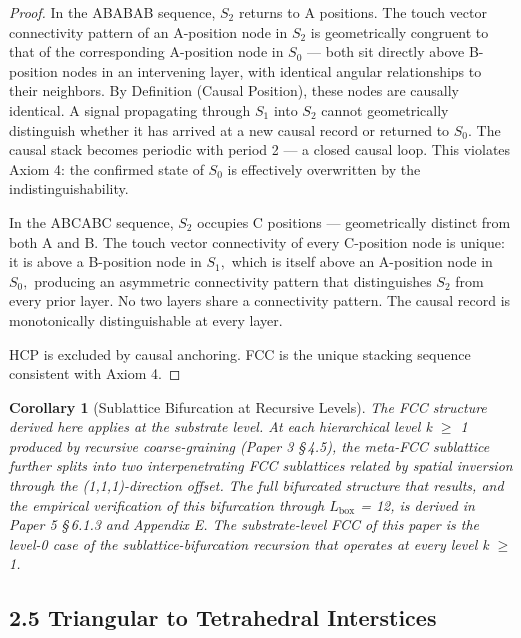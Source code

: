 \documentclass[11pt,oneside]{report}
\newtheorem{corollary}[theorem]{Corollary}
\theoremstyle{definition}
\theoremstyle{remark}
\begin{document}
\begin{proof}
In the ABABAB sequence, \ensuremath{S_{2}} returns to A positions. The touch
vector connectivity pattern of an A-position node in \ensuremath{S_{2}} is geometrically
congruent to that of the corresponding A-position node in \ensuremath{S_{0}} --- both
sit directly above B-position nodes in an intervening layer, with
identical angular relationships to their neighbors. By Definition
(Causal Position), these nodes are causally identical. A signal
propagating through \ensuremath{S_{1}} into \ensuremath{S_{2}} cannot geometrically distinguish whether
it has arrived at a new causal record or returned to \ensuremath{S_{0}.} The causal
stack becomes periodic with period 2 --- a closed causal loop. This
violates Axiom 4: the confirmed state of \ensuremath{S_{0}} is effectively overwritten
by the indistinguishability.

In the ABCABC sequence, \ensuremath{S_{2}} occupies C positions --- geometrically
distinct from both A and B. The touch vector connectivity of every
C-position node is unique: it is above a B-position node in \ensuremath{S_{1},} which is
itself above an A-position node in \ensuremath{S_{0},} producing an asymmetric
connectivity pattern that distinguishes \ensuremath{S_{2}} from every prior layer. No
two layers share a connectivity pattern. The causal record is
monotonically distinguishable at every layer.

HCP is excluded by causal anchoring. FCC is the unique stacking sequence
consistent with Axiom 4.

\end{proof}

\begin{corollary}[Sublattice Bifurcation at Recursive Levels]
The FCC structure derived here applies at the substrate level. At
each hierarchical level k \ensuremath{\geq} 1 produced by recursive coarse-graining
(Paper 3 \S\,4.5), the meta-FCC sublattice further splits into two
interpenetrating FCC sublattices related by spatial inversion through
the (1,1,1)-direction offset. The full bifurcated structure that
results, and the empirical verification of this bifurcation through
\ensuremath{L_{\mathrm{box}}} = 12, is derived in Paper 5 \S\,6.1.3 and Appendix E. The
substrate-level FCC of this paper is the level-0 case of the
sublattice-bifurcation recursion that operates at every level k \ensuremath{\geq} 1.
\end{corollary}

\subsection*{2.5 Triangular to Tetrahedral Interstices}
\end{document}
